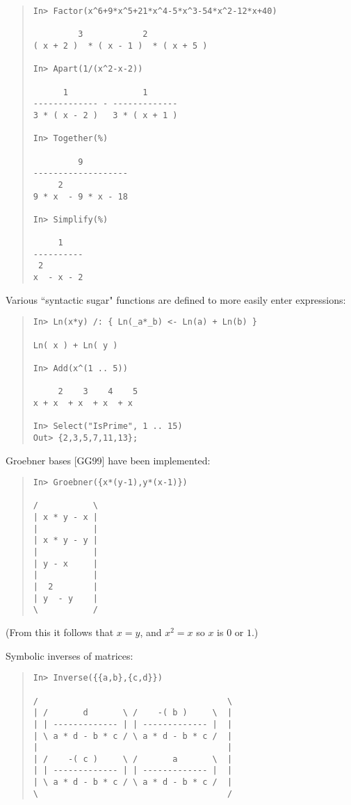 \documentclass{llncs}
\begin{document}
\begin{quote}\small\begin{verbatim}
In> Factor(x^6+9*x^5+21*x^4-5*x^3-54*x^2-12*x+40)

         3            2            
( x + 2 )  * ( x - 1 )  * ( x + 5 )

In> Apart(1/(x^2-x-2))

      1               1      
------------- - -------------
3 * ( x - 2 )   3 * ( x + 1 )

In> Together(%)

         9         
-------------------
     2             
9 * x  - 9 * x - 18

In> Simplify(%)

     1     
----------
 2        
x  - x - 2

\end{verbatim}\end{quote}

Various ``syntactic sugar" functions are defined to more easily enter
expressions:

\begin{quote}\small\begin{verbatim}
In> Ln(x*y) /: { Ln(_a*_b) <- Ln(a) + Ln(b) }

Ln( x ) + Ln( y )

In> Add(x^(1 .. 5))

     2    3    4    5
x + x  + x  + x  + x 

In> Select("IsPrime", 1 .. 15)
Out> {2,3,5,7,11,13};

\end{verbatim}\end{quote}
Groebner bases [GG99] have been implemented:

\begin{quote}\small\begin{verbatim}
In> Groebner({x*(y-1),y*(x-1)})

/           \
| x * y - x |
|           |
| x * y - y |
|           |
| y - x     |
|           |
|  2        |
| y  - y    |
\           /
\end{verbatim}\end{quote}
(From this it  follows that $x = y$, and $x ^{2} = x$ so $x$ is $0$ or $1$.)

Symbolic inverses of matrices:

\begin{quote}\small\begin{verbatim}
In> Inverse({{a,b},{c,d}})

/                                      \
| /       d       \ /    -( b )     \  |
| | ------------- | | ------------- |  |
| \ a * d - b * c / \ a * d - b * c /  |
|                                      |
| /    -( c )     \ /       a       \  |
| | ------------- | | ------------- |  |
| \ a * d - b * c / \ a * d - b * c /  |
\                                      /
\end{verbatim}\end{quote}
\end{document}
